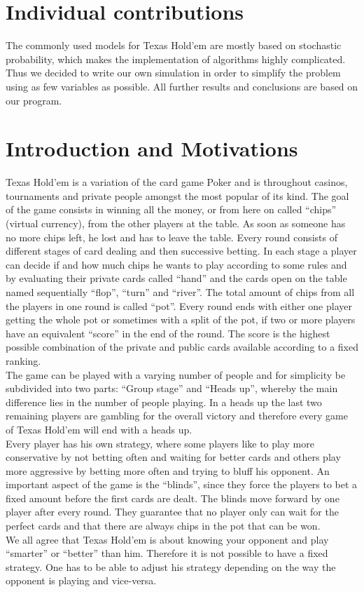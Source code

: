 \documentclass[11pt]{article}
\begin{document}
\section{Individual contributions}

The commonly used models for Texas Hold'em are mostly based on stochastic probability, which makes the implementation of algorithms highly complicated. Thus we decided to write our own simulation in order to simplify the problem using as few variables as possible. All further results and conclusions are based on our program.


\section{Introduction and Motivations}

Texas Hold’em is a variation of the card game Poker and is throughout casinos, tournaments and private people amongst the most popular of its kind. The goal of the game consists in winning all the money, or from here on called “chips” (virtual currency), from the other players at the table. As soon as someone has no more chips left, he lost and has to leave the table.
Every round consists of different stages of card dealing and then successive betting. In each stage a player can decide if and how much chips he wants to play according to some rules and by evaluating their private cards called “hand” and the cards open on the table named sequentially “flop”, “turn” and “river”.
The total amount of chips from all the players in one round is called “pot”. Every round ends with either one player getting the whole pot or sometimes with a split of the pot, if two or more players have an equivalent “score” in the end of the round. The score is the highest possible combination of the private and public cards available according to a fixed ranking.
\\
The game can be played with a varying number of people and for simplicity be subdivided into two parts: “Group stage” and “Heads up”, whereby the main difference lies in the number of people playing. In a heads up the last two remaining players are gambling for the overall victory and therefore every game of Texas Hold’em will end with a heads up.
\\
Every player has his own strategy, where some players like to play more conservative by not betting often and waiting for better cards and others play more aggressive by betting more often and trying to bluff his opponent. An important aspect of the game is the “blinds”, since they force the players to bet a fixed amount before the first cards are dealt. The blinds move forward by one player after every round. They guarantee that no player only can wait for the perfect cards and that there are always chips in the pot that can be won.
\\							
We all agree that Texas Hold’em is about knowing your opponent and play “smarter” or “better” than him. Therefore it is not possible to have a fixed strategy. One has to be able to adjust his strategy depending on the way the opponent is playing and vice-versa.\\
 
\end{document}
